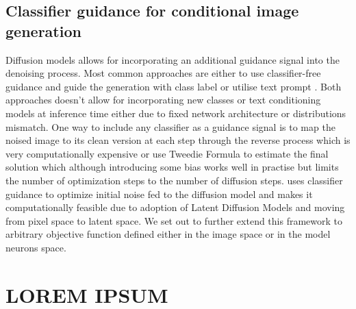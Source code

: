 \documentclass[licencjacka,en]{pracamgr}
\begin{document}
\section{Classifier guidance for conditional image generation}
Diffusion models allows for incorporating an additional guidance signal into the denoising process. Most common approaches are either to use classifier-free guidance \cite{ho2022classifierfreediffusionguidance} and guide the generation with class label or utilise text prompt \cite{rombach2022highresolutionimagesynthesislatent}.
Both approaches doesn't allow for incorporating new classes or text conditioning models at inference time either due to fixed network architecture or distributions mismatch.
One way to include any classifier as a guidance signal is to map the noised image to its clean version at each step through the reverse process\cite{jeanneret2022diffusionmodelscounterfactualexplanations} which is very computationally expensive or use Tweedie Formula \citep{robbins1992empirical, chung2022improving, weng2024fast} to estimate the final solution which although introducing some bias works well in practise but limits the number of optimization steps to the number of diffusion steps. 
\cite{augustin2024digindiffusionguidanceinvestigating} uses classifier guidance to optimize initial noise fed to the diffusion model and makes it computationally feasible due to adoption of Latent Diffusion Models and moving from pixel space to latent space.
We set out to further extend this framework to arbitrary objective function defined either in the image space or in the model neurons space.

\chapter{LOREM IPSUM}


\end{document}
